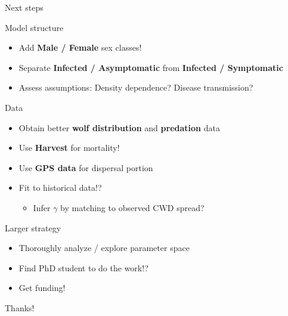 \documentclass[
  11pt,
  ignorenonframetext,
  aspectratio=43]{beamer}
\providecommand{\tightlist}{%
  \setlength{\itemsep}{0pt}\setlength{\parskip}{0pt}}
\begin{document}
\begin{frame}{Next steps}
\protect\hypertarget{next-steps}{}
\footnotesize

\begin{block}{Model structure}
\protect\hypertarget{model-structure}{}
\begin{itemize}
\tightlist
\item
  Add \textbf{Male / Female} sex classes!
\item
  Separate \textbf{Infected / Asymptomatic} from \textbf{Infected /
  Symptomatic}
\item
  Assess assumptions: Density dependence? \textbar{} Disease
  transmission? \pause
\end{itemize}
\end{block}

\begin{block}{Data}
\protect\hypertarget{data-3}{}
\begin{itemize}
\tightlist
\item
  Obtain better \textbf{wolf distribution} and \textbf{predation} data
\item
  Use \textbf{Harvest} for mortality!
\item
  Use \textbf{GPS data} for dispersal portion
\item
  Fit to historical data!?

  \begin{itemize}
  \tightlist
  \item
    Infer \(\gamma\) by matching to observed CWD spread? \pause
  \end{itemize}
\end{itemize}
\end{block}

\begin{block}{Larger strategy}
\protect\hypertarget{larger-strategy}{}
\begin{itemize}
\tightlist
\item
  Thoroughly analyze / explore parameter space
\item
  Find PhD student to do the work!?
\item
  Get funding!
\end{itemize}
\end{block}
\end{frame}

\begin{frame}{}
\protect\hypertarget{section}{}
\bc
\Huge

Thanks! \ec
\end{frame}
\end{document}
